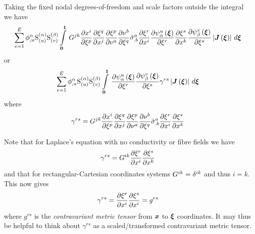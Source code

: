 Taking the fixed nodal degrees-of-freedom and scale factors outside the integral we have
\begin{equation}
  \dsum_{e=1}^{E}\nodedof{\phi}{\alpha}{u}\gsf{(\alpha)}{(u)}\gsf{(\beta)}{(v)}
  \gint{\vect{0}}{\vect{1}}{G^{jk}\delby{x^{i}}{\xi^{p}}
    \delby{\xi^{q}}{x^{j}}\delby{\xi^{p}} {\nu^{a}}
    \delby{\nu^{b}}{\xi^{q}}{\tilde{\sigma}}^{a}_{.b}\delby{\xi^{r}}{x^{i}}
    \delby{\gbfn{\alpha}{u}{\vect{\xi}}}{\xi^{r}}
    \delby{\xi^{s}}{x^{k}}\delby{\gbfn{\beta}{v}{\vect{\xi}}}{\xi^{s}}
    \abs{\fnof{\matr{J}}{\vect{\xi}}}}{\vect{\xi}}
  \label{eqn:elementalfemlhs1}
\end{equation}
or
\begin{equation}
  \dsum_{e=1}^{E}\nodedof{\phi}{\alpha}{u}\gsf{(\alpha)}{(u)}\gsf{(\beta)}{(v)}
  \gint{\vect{0}}{\vect{1}}{\delby{\gbfn{\alpha}{u}{\vect{\xi}}}{\xi^{r}}\delby{\gbfn{\beta}{v}{\vect{\xi}}}{\xi^{s}}\gamma^{rs}
    \abs{\fnof{\matr{J}}{\vect{\xi}}}}{\vect{\xi}}
  \label{eqn:elementalfemlhs2}
\end{equation}
where
\begin{equation}
  \gamma^{rs}=G^{jk} \dfrac{\partial x^{i}}{\partial \xi^{p}} 
     \dfrac{\partial \xi^{q}}{\partial x^{j}}  \dfrac{\partial \xi^{p}}{\partial \nu^{a}} 
     \dfrac{\partial \nu^{b}}{\partial \xi^{q}} {\tilde{\sigma}}^{a}_{.b} \dfrac{\partial \xi^{r}}{\partial x^{i}}  \dfrac{\partial \xi^{s}}{\partial x^{k}} 
\end{equation}

Note that for Laplace's equation with no conductivity or fibre fields we have
\begin{equation}
  \gamma^{rs}=G^{ik} \dfrac{\partial \xi^{r}}{\partial x^{i}}  \dfrac{\partial \xi^{s}}{\partial x^{k}} 
\end{equation}
and that for rectangular-Cartesian coordinates systems
$G^{ik}=\delta^{{i}{k}}$ and thus $i=k$. This now gives
\begin{equation}
  \gamma^{rs}= \dfrac{\partial \xi^{r}}{\partial x^{i}}  \dfrac{\partial \xi^{s}}{\partial x^{i}} =g^{rs}
  \label{eqn:contrametrictensor}
\end{equation}
where $g^{rs}$ is the \emph{contravariant metric tensor} from $\vect{x}$ to
$\vect{\xi}$ coordinates. It may thus be helpful to think about $\gamma^{rs}$
as a scaled/transformed contravariant metric tensor.

